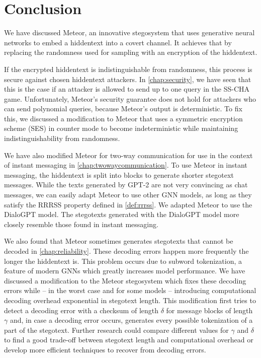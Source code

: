 \chapter{Conclusion}
\label{chap:conclusion}

We have discussed Meteor, an innovative stegosystem that uses generative neural networks to embed a hiddentext into a covert channel.
It achieves that by replacing the randomness used for sampling with an encryption of the hiddentext.

If the encrypted hiddentext is indistinguishable from randomness, this process is secure against chosen hiddentext attackers.
In \autoref{chap:security}, we have seen that this is the case if an attacker is allowed to send up to one query in the SS-CHA game.
Unfortunately, Meteor's security guarantee does not hold for attackers who can send polynomial queries, because Meteor's output is deterministic.
To fix this, we discussed a modification to Meteor that uses a symmetric encryption scheme (SES) in counter mode to become indeterministic while maintaining indistinguishability from randomness.

We have also modified Meteor for two-way communication for use in the context of instant messaging in \autoref{chap:twowaycommunication}.
To use Meteor in instant messaging, the hiddentext is split into blocks to generate shorter stegotext messages.
While the texts generated by GPT-2 are not very convincing as chat messages, we can easily adapt Meteor to use other GNN models, as long as they satisfy the RRRSS property defined in \autoref{def:rrrss}.
We adapted Meteor to use the DialoGPT model.
The stegotexts generated with the DialoGPT model more closely resemble those found in instant messaging.

We also found that Meteor sometimes generates stegotexts that cannot be decoded in \autoref{chap:reliability}.
These decoding errors happen more frequently the longer the hiddentext is.
This problem occurs due to subword tokenization, a feature of modern GNNs which greatly increases model performance.
We have discussed a modification to the Meteor stegosystem which fixes these decoding errors while -- in the worst case and for some models -- introducing computational decoding overhead exponential in stegotext length.
This modification first tries to detect a decoding error with a checksum of length $\delta$ for message blocks of length $\gamma$ and, in case a decoding error occurs, generates every possible tokenization of a part of the stegotext.
Further research could compare different values for $\gamma$ and $\delta$ to find a good trade-off between stegotext length and computational overhead or develop more efficient techniques to recover from decoding errors.

